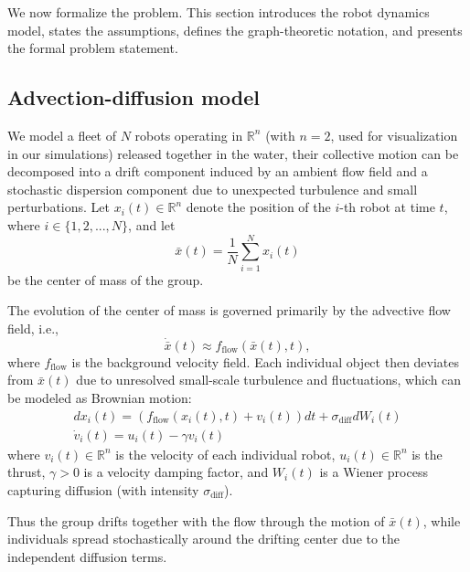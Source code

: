 \documentclass[conference]{IEEEconf}
\newcommand{\xyu}[1]{\textcolor{magenta}{#1}}
\theoremstyle{plain}
\begin{document}
We now formalize the problem. This section introduces the robot dynamics model, states the assumptions, defines the graph-theoretic notation, and presents the formal problem statement.
\subsection{Advection-diffusion model \cite{taylor1922, okubo1971, majda1999}}

We model a fleet of $N$ robots operating in $\mathbb{R}^n$ (with $n=2$, used for visualization in our simulations) released together in the water, their collective motion can be decomposed into a drift component induced by an ambient flow field and a stochastic dispersion component due to unexpected turbulence and small perturbations. Let $x_i(t) \in \mathbb{R}^n$ denote the position of the $i$-th robot at time $t$, where $i\in \{1,2,...,N\}$, and let  
\[
\bar{x}(t) = \frac{1}{N} \sum_{i=1}^N x_i(t)
\]  
be the center of mass of the group. 

The evolution of the center of mass is governed primarily by the advective flow field, i.e.,  
\[
\dot{\bar{x}}(t) \approx f_{\text{flow}}(\bar{x}(t),t),
\]  
where $f_{\text{flow}}$ is the background velocity field. Each individual object then deviates from $\bar{x}(t)$ due to unresolved small-scale turbulence and fluctuations, which can be modeled as Brownian motion:  
\begin{equation}
\begin{gathered}
    dx_i(t) = (f_{\text{flow}}(x_i(t), t) + v_i(t)) dt + \sigma_{\text{diff}} dW_i(t) \\
    \dot{v}_i(t) = u_i(t) - \gamma v_i(t)
\end{gathered}
\end{equation}
\noindent where $v_i(t) \in \mathbb{R}^n$ is the velocity of each individual robot, $u_i(t) \in \mathbb{R}^n$ is the thrust, $\gamma > 0$ is a velocity damping factor, and $W_i(t)$ is a Wiener process capturing diffusion (with intensity $\sigma_{\text{diff}}$).

Thus the group drifts together with the flow through the motion of $\bar{x}(t)$, while individuals spread stochastically around the drifting center due to the independent diffusion terms.
\end{document}
